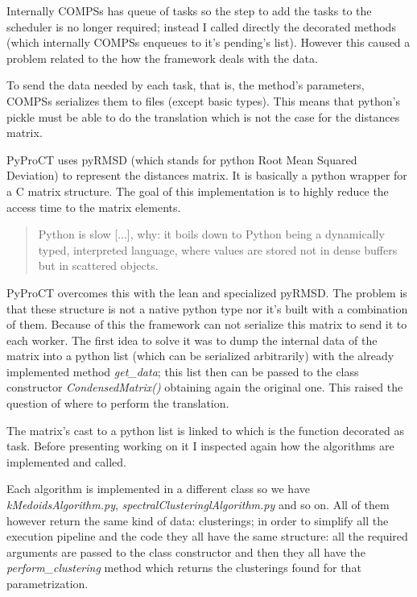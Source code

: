 Internally COMPSs has queue of tasks so the step to add the tasks to the scheduler is no longer required; instead I called directly the decorated methods (which internally COMPSs enqueues to it's pending's list). However this caused a problem related to the how the framework deals with the data.

To send the data needed by each task, that is, the method's parameters, COMPSs serializes them to files (except basic types). This means that python's pickle must be able to do the translation which is not the case for the distances matrix.

PyProCT uses pyRMSD \cite{Gil2013} (which stands for python Root Mean Squared Deviation) to represent the distances matrix. It is basically a python wrapper for a C matrix structure. The goal of this implementation is to highly reduce the access time to the matrix elements. 

\begin{quote}
Python is slow [...], why: it boils down to Python being a dynamically typed, interpreted language, where values are stored not in dense buffers but in scattered objects. \cite{vanderplas_why_2014}
\end{quote}

PyProCT overcomes this with the lean and specialized pyRMSD. The problem is that these structure is not a native python type nor it's built with a combination of them. Because of this the framework can not serialize this matrix to send it to each worker. The first idea to solve it was to dump the internal data of the matrix into a python list (which can be serialized arbitrarily) with the already implemented method \textit{get\_data}; this list then can be passed to the class constructor \textit{CondensedMatrix()} obtaining again the original one. This raised the question of where to perform the translation. 

The matrix's cast to a python list is linked to which is the function decorated as task. Before presenting working on it I inspected again how the algorithms are implemented and called. 

Each algorithm is implemented in a different class so we have \textit{kMedoidsAlgorithm.py}, \textit{spectralClusteringlAlgorithm.py} and so on. All of them however return the same kind of data: clusterings; in order to simplify all the execution pipeline and the code they all have the same structure: all the required arguments are passed to the class constructor and then they all have the \textit{perform\_clustering} method which returns the clusterings found for that parametrization. 

